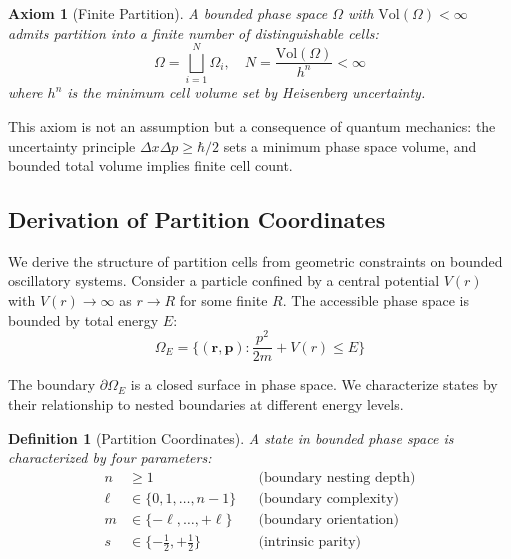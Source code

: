 \documentclass[twocolumn,aps,prx,superscriptaddress,longbibliography]{revtex4-2}
\newtheorem{definition}[theorem]{Definition}
\newtheorem{axiom}[theorem]{Axiom}
\theoremstyle{remark}
\begin{document}
\begin{axiom}[Finite Partition]
\label{ax:finite}
A bounded phase space $\Omega$ with $\text{Vol}(\Omega) < \infty$ admits
partition into a finite number of distinguishable cells:
\begin{equation}
\Omega = \bigsqcup_{i=1}^{N} \Omega_i, \quad N = \frac{\text{Vol}(\Omega)}{h^n} < \infty
\label{eq:partition}
\end{equation}
where $h^n$ is the minimum cell volume set by Heisenberg uncertainty.
\end{axiom}

This axiom is not an assumption but a consequence of quantum mechanics: the
uncertainty principle $\Delta x \Delta p \geq \hbar/2$ sets a minimum phase
space volume, and bounded total volume implies finite cell count.

\subsection{Derivation of Partition Coordinates}

We derive the structure of partition cells from geometric constraints on
bounded oscillatory systems. Consider a particle confined by a central
potential $V(r)$ with $V(r) \to \infty$ as $r \to R$ for some finite $R$.
The accessible phase space is bounded by total energy $E$:
\begin{equation}
\Omega_E = \{(\mathbf{r}, \mathbf{p}) : \frac{p^2}{2m} + V(r) \leq E\}
\end{equation}

The boundary $\partial\Omega_E$ is a closed surface in phase space. We
characterize states by their relationship to nested boundaries at different
energy levels.

\begin{definition}[Partition Coordinates]
\label{def:coords}
A state in bounded phase space is characterized by four parameters:
\begin{align}
n &\geq 1 && \text{(boundary nesting depth)} \label{eq:n} \\
\ell &\in \{0, 1, \ldots, n-1\} && \text{(boundary complexity)} \label{eq:l} \\
m &\in \{-\ell, \ldots, +\ell\} && \text{(boundary orientation)} \label{eq:m} \\
s &\in \{-\tfrac{1}{2}, +\tfrac{1}{2}\} && \text{(intrinsic parity)} \label{eq:s}
\end{align}
\end{definition}
\end{document}
